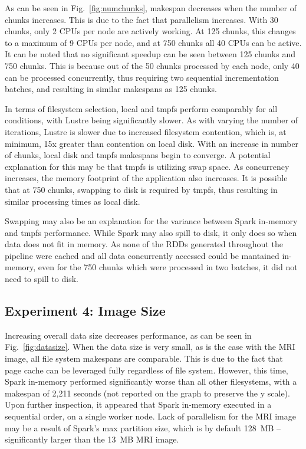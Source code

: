 \documentclass{IEEEtran}
\begin{document}
As can be seen in Fig.~\ref{fig:numchunks}, makespan decreases when the number 
of chunks increases. This is due to the fact that parallelism increases. With 
30 chunks, only 2 CPUs per node are actively working. At 125 chunks, this 
changes to a maximum of 9 CPUs per node, and at 750 chunks all 40 CPUs can be 
active. It can be noted that no significant speedup can be seen between 125 
chunks and 750 chunks. This is because out of the 50 chunks processed by each 
node, only 40 can be processed concurrently, thus requiring two sequential 
incrementation batches, and resulting in similar makespans as 125 
chunks.

In terms of filesystem selection, local and tmpfs perform comparably for all 
conditions, with Lustre being significantly slower. As with varying the number 
of iterations, Lustre is slower due to increased filesystem contention, which 
is, at minimum, 15x greater than contention on local disk. With an increase in 
number of chunks, local disk and tmpfs makespans begin to converge. A potential 
explanation for this may be that tmpfs is utilizing swap space. As concurrency 
increases, the memory footprint of the application also increases. It is 
possible that at 750 chunks, swapping to disk is required by tmpfs, thus 
resulting in similar processing times as local disk.

Swapping may also be an explanation for the variance between Spark in-memory 
and tmpfs performance. While Spark may also spill to disk, it only does so when
data does not fit in memory. As none of the RDDs generated throughout the 
pipeline were cached and all data concurrently accessed could be mantained 
in-memory, even for the 750 chunks which were processed in two batches, it did 
not need to spill to disk.

\subsection{Experiment 4: Image Size}

Increasing overall data size decreases performance, as can be seen in 
Fig.~\ref{fig:datasize}. When the data size is very small, as is the case 
with the MRI image, all file system makespans are comparable. This is due to the 
fact that page cache can be leveraged fully regardless of file system. However, 
this time, Spark in-memory performed significantly worse than all other 
filesystems, with a makespan of 2,211 seconds (not reported on the graph to preserve the y scale). Upon further inspection, it appeared that Spark in-memory executed
in a sequential order, on a single worker node. Lack of parallelism for the MRI 
image may be a result of Spark's max partition size, which is by default 128~MB
-- significantly larger than the 13~MB MRI image. 
\end{document}
